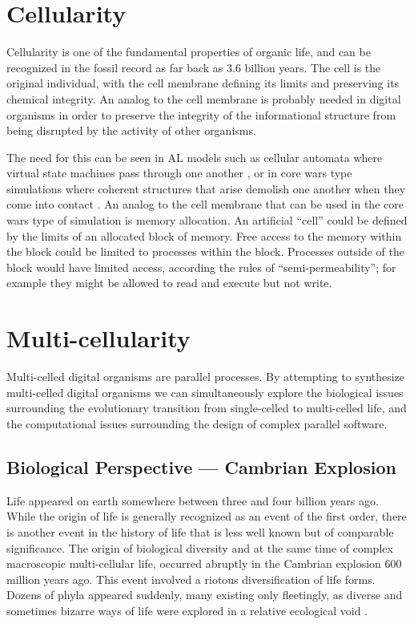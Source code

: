 \section{Cellularity}

Cellularity is one of the fundamental properties of organic life, and can
be recognized in the fossil record as far back as 3.6 billion years.  The
cell is the original individual, with the cell membrane defining its limits
and preserving its chemical integrity.  An analog to the cell membrane is
probably needed in digital organisms in order to preserve the integrity of
the informational structure from being disrupted by the activity of other
organisms.

The need for this can be seen in AL models such as cellular automata where
virtual state machines pass through one another \cite{Lang86}, or in core
wars type simulations where coherent structures that arise demolish one
another when they come into contact \cite{Rasm90,Rasm91}.  An analog to
the cell membrane that can be used in the core wars type of simulation is
memory allocation.  An artificial ``cell'' could be defined by the limits
of an allocated block of memory.  Free access to the memory within the
block could be limited to processes within the block.  Processes outside
of the block would have limited access, according the rules of
``semi-permeability''; for example they might be allowed to read and
execute but not write.

\section{Multi-cellularity}

Multi-celled digital organisms are parallel processes.  By attempting
to synthesize multi-celled digital organisms we can simultaneously
explore the biological issues surrounding the evolutionary transition
from single-celled to multi-celled life, and the computational issues
surrounding the design of complex parallel software.

\subsection{Biological Perspective --- Cambrian Explosion}

Life appeared on earth somewhere between three and four billion years
ago.  While the origin of life is generally recognized as an event of
the first order, there is another event in the history of life that is
less well known but of comparable significance.  The origin of biological
diversity and at the same time of complex macroscopic multi-cellular
life, occurred abruptly in the Cambrian explosion 600 million years ago.
This event involved a riotous diversification of life forms.  Dozens of
phyla appeared suddenly, many existing only fleetingly, as diverse and
sometimes bizarre ways of life were explored in a relative ecological void
\cite{Goul,Morr}.

